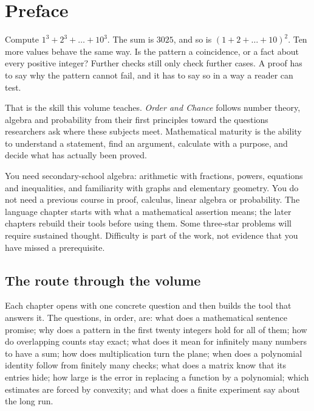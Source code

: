 \chapter*{Preface}
Compute $1^3+2^3+\dots+10^3$. The sum is $3025$, and so is $(1+2+\dots+10)^2$.
Ten more values behave the same way. Is the pattern a coincidence, or a fact about
every positive integer? Further checks still only check further cases. A proof has
to say why the pattern cannot fail, and it has to say so in a way a reader can test.

That is the skill this volume teaches. \emph{Order and Chance} follows number
theory, algebra and probability from their first principles toward the questions
researchers ask where these subjects meet. Mathematical maturity is the ability
to understand a statement, find an argument, calculate with a purpose, and decide
what has actually been proved.

You need secondary-school algebra: arithmetic with fractions, powers, equations
and inequalities, and familiarity with graphs and elementary geometry. You do not
need a previous course in proof, calculus, linear algebra or probability. The
language chapter starts with what a mathematical assertion means; the later
chapters rebuild their tools before using them. Some three-star problems will
require sustained thought. Difficulty is part of the work, not evidence that you
have missed a prerequisite.

\section*{The route through the volume}
Each chapter opens with one concrete question and then builds the tool that
answers it. The questions, in order, are: what does a mathematical sentence
promise; why does a pattern in the first twenty integers hold for all of them;
how do overlapping counts stay exact; what does it mean for infinitely many
numbers to have a sum; how does multiplication turn the plane; when does a
polynomial identity follow from finitely many checks; what does a matrix know
that its entries hide; how large is the error in replacing a function by a
polynomial; which estimates are forced by convexity; and what does a finite
experiment say about the long run.

